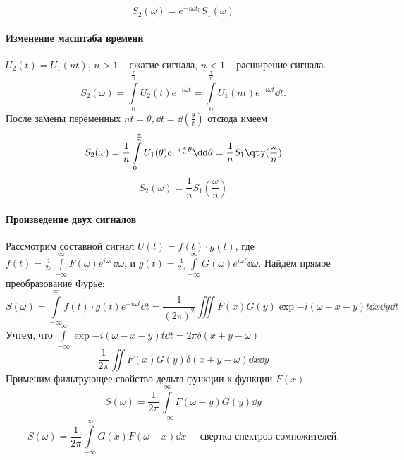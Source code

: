 \documentclass[a4paper,14pt]{extarticle}
\begin{document}
\begin{equation}
    \label{eq:}
    \boxed{
    S_{2}(\omega) = e^{-i \omega t_{0}} S_{1}(\omega)}
\end{equation}

\paragraph{Изменение масштаба времени}%
$U_2(t) = U_{1}(nt)$, $n>1$ -- сжатие сигнала, $n<1$ -- расширение сигнала.
\begin{equation}
    \label{eq:}
    S_{2} (\omega) = \int\limits_{0}^{\frac{\tau}{n}} U_{2}(t) e^{-i\omega t}
    = \int\limits_{0}^{\frac{\tau}{n}}  U_{1}(nt) e^{-i \omega t} \dd t.
\end{equation}
После замены переменных $nt = \theta, \dd t = \dd(\frac{\theta}{t})$
 отсюда имеем
\begin{equation}
    \label{eq:}
    S_{2}(\omega) = \frac{1}{n} \int\limits_{0}^{\frac{\tau}{n}}  
    U_{1}(\theta) e^{-i \frac{\omega}{n} \theta} \dd \theta = \frac{1}{n}
    S_1\qty(\frac{\omega}{n})
\end{equation}
\begin{equation}
    \label{eq:}
    \boxed{
        S_{2}(\omega) = \frac{1}{n} S_{1}(\frac{\omega}{n})
    }
\end{equation}
\paragraph{Произведение двух сигналов}%
Рассмотрим составной сигнал $U(t) = f(t) \cdot g(t)$, где 
$f(t) = \frac{1}{2 \pi} \int\limits_{-\infty}^{\infty} 
F(\omega) e^{i \omega t} \dd \omega $, и 
$g(t) = \frac{1}{2 \pi} \int\limits_{-\infty}^{\infty} 
G(\omega) e^{i \omega t} \dd \omega $.  
Найдём прямое преобразование Фурье:
\begin{equation}
    \label{eq:}
    S(\omega) = \int\limits_{-\infty}^{\infty} 
    f(t)\cdot g(t) e^{-i \omega t} \dd t = 
    \frac{1}{(2 \pi)^2} \iiint F(x) G(y) \exp{- i(\omega - x - y)t} \dd{x} \dd{y} \dd{t} 
\end{equation}
Учтем, что 
$\int\limits_{-\infty}^{\infty}   \exp{-i(\omega-x-y)t} \dd t = 
2 \pi \delta(x+y - \omega) $
\begin{equation}
    \label{eq:}
    \frac{1}{2 \pi}  \iint F(x) G(y) \delta(x+y-\omega) \dd{x} \dd{y}
\end{equation}
Применим фильтрующее свойство дельта-функции к функции $F(x)$ 
\begin{equation}
    \label{eq:}
    S(\omega) = \frac{1}{2 \pi} \int\limits_{-\infty}^{\infty} 
    F(\omega - y) G(y) \dd{y}
\end{equation}
\begin{equation}
    \label{eq:}
    \boxed{
        S(\omega) = \frac{1}{2 \pi} \int\limits_{-\infty}^{\infty} 
        G(x) F(\omega - x) \dd{x}  ~ 
    } \text{ -- свертка спектров сомножителей.}
\end{equation}
\end{document}

